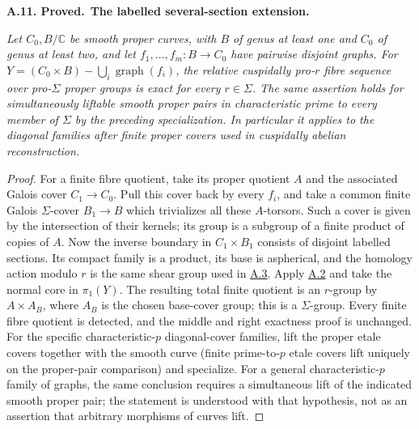 \documentclass[11pt,a4paper]{article}
\newenvironment{claim}[3]{\par\medskip\noindent\hypertarget{#1}{\textbf{#1. #2.}}\ \textbf{#3.}\par\nopagebreak\smallskip\begingroup\itshape}{\endgroup\par\smallskip}
\newcommand{\statementref}[1]{\hyperlink{#1}{#1}}
\begin{document}
\begin{claim}{A.11}{Proved}{The labelled several-section extension}
Let $C_0,B/\mathbb C$ be smooth proper curves, with $B$ of genus at
least one and $C_0$ of genus at least two, and let
$f_1,\ldots,f_m:B\to C_0$ have pairwise disjoint graphs. For
$Y=(C_0\times B)-\bigcup_i\operatorname{graph}(f_i)$, the relative
cuspidally pro-$r$ fibre sequence over pro-$\Sigma$ proper groups
is exact for every $r\in\Sigma$. The same assertion holds for simultaneously liftable
smooth proper pairs in characteristic prime to every member of
$\Sigma$ by the preceding specialization. In particular it applies
to the diagonal families after finite proper covers used in
cuspidally abelian reconstruction.
\end{claim}
\begin{proof}
For a finite fibre quotient, take its proper quotient $A$ and the
associated Galois cover $C_1\to C_0$. Pull this cover back by every
$f_i$, and take a common finite Galois $\Sigma$-cover $B_1\to B$
which trivializes all these $A$-torsors. Such a cover is given by
the intersection of their kernels; its group is a subgroup of a
finite product of copies of $A$. Now the inverse boundary in
$C_1\times B_1$ consists of disjoint labelled sections. Its compact
family is a product, its base is aspherical, and the homology action
modulo $r$ is the same shear group used in
\statementref{A.3}. Apply \statementref{A.2} and take the
normal core in $\pi_1(Y)$. The resulting total finite quotient is
an $r$-group by $A\times A_B$, where $A_B$ is the chosen base-cover
group; this is a $\Sigma$-group. Every finite fibre quotient is
detected, and the middle and right exactness proof is unchanged.
For the specific characteristic-$p$ diagonal-cover families, lift
the proper etale covers together with the smooth curve (finite
prime-to-$p$ etale covers lift uniquely on the proper-pair comparison)
and specialize. For a general characteristic-$p$ family of graphs,
the same conclusion requires a simultaneous lift of the indicated
smooth proper pair; the statement is understood with that hypothesis,
not as an assertion that arbitrary morphisms of curves lift.
\end{proof}
\end{document}
